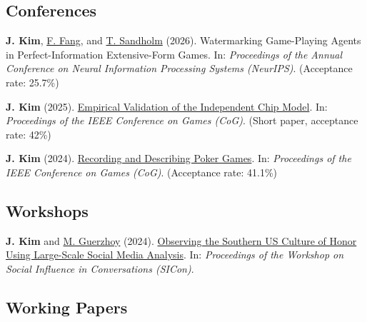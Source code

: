 \documentclass{article}
\begin{document}
	\subsection*{Conferences}

	\begin{etaremune}
		\item \textbf{J. Kim}, \href{https://feifang.info/}{F. Fang}, and \href{https://www.cs.cmu.edu/~sandholm/}{T. Sandholm} (2026). Watermarking Game-Playing Agents in Perfect-Information Extensive-Form Games. In: \textit{Proceedings of the Annual Conference on Neural Information Processing Systems (NeurIPS)}. (Acceptance rate: 25.7\%)
		\item \textbf{J. Kim} (2025). \href{https://doi.org/10.1109/CoG64752.2025.11114139}{Empirical Validation of the Independent Chip Model}. In: \textit{Proceedings of the IEEE Conference on Games (CoG)}. (Short paper, acceptance rate: 42\%)
		\item \textbf{J. Kim} (2024). \href{https://doi.org/10.1109/CoG60054.2024.10645611}{Recording and Describing Poker Games}. In: \textit{Proceedings of the IEEE Conference on Games (CoG)}. (Acceptance rate: 41.1\%)
	\end{etaremune}

	\subsection*{Workshops}

	\begin{etaremune}
		\item \textbf{J. Kim} and \href{https://www.cs.toronto.edu/~guerzhoy/}{M. Guerzhoy} (2024). \href{https://doi.org/10.18653/v1/2024.sicon-1.1}{Observing the Southern US Culture of Honor Using Large-Scale Social Media Analysis}. In: \textit{Proceedings of the Workshop on Social Influence in Conversations (SICon)}.
	\end{etaremune}

	\subsection*{Working Papers}
\end{document}

